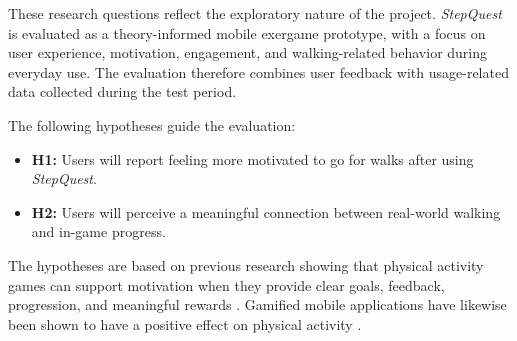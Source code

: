 These research questions reflect the exploratory nature of the project. \textit{StepQuest} is evaluated as a theory-informed mobile exergame prototype, with a focus on user experience, motivation, engagement, and walking-related behavior during everyday use. The evaluation therefore combines user feedback with usage-related data collected during the test period.

The following hypotheses guide the evaluation:

\begin{itemize}
	\item \textbf{H1:} Users will report feeling more motivated to go for walks after using \textit{StepQuest}.
	
	\item \textbf{H2:} Users will perceive a meaningful connection between real-world walking and in-game progress.
\end{itemize}

The hypotheses are based on previous research showing that physical activity games can support motivation when they provide clear goals, feedback, progression, and meaningful rewards \cite{10.1145/1321261.1321313,Kubota2022Pilot}. Gamified mobile applications have likewise been shown to have a positive effect on physical activity \cite{Yang2022GamifiedAppsPA}.